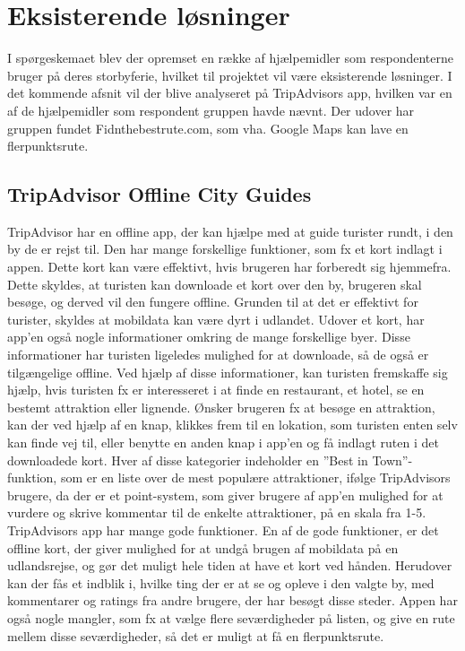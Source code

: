 \section{Eksisterende løsninger}
I spørgeskemaet blev der opremset en række af hjælpemidler som respondenterne bruger på deres storbyferie, hvilket til projektet vil være eksisterende løsninger. I det kommende afsnit vil der blive analyseret på TripAdvisors app, hvilken var en af de hjælpemidler som respondent gruppen havde nævnt. Der udover har gruppen fundet Fidnthebestrute.com, som vha. Google Maps kan lave en flerpunktsrute.  

\subsection{TripAdvisor Offline City Guides}
TripAdvisor har en offline app, der kan hjælpe med at guide turister rundt, i den by de er rejst til. Den har mange forskellige funktioner, som fx et kort indlagt i appen. Dette kort kan være effektivt, hvis brugeren har forberedt sig hjemmefra. Dette skyldes, at turisten kan downloade et kort over den by, brugeren skal besøge, og derved vil den fungere offline. Grunden til at det er effektivt for turister, skyldes at mobildata kan være dyrt i udlandet\citep {TDC}. \newline
Udover et kort, har app'en også nogle informationer omkring de mange forskellige byer. Disse informationer har turisten ligeledes mulighed for at downloade, så de også er tilgængelige offline. Ved hjælp af disse informationer, kan turisten fremskaffe sig hjælp, hvis turisten fx er interesseret i at finde en restaurant, et hotel, se en bestemt attraktion eller lignende. Ønsker brugeren fx at besøge en attraktion, kan der ved hjælp af en knap, klikkes frem til en lokation, som turisten enten selv kan finde vej til, eller benytte en anden knap i app'en og få indlagt ruten i det downloadede kort.\newline
Hver af disse kategorier indeholder en ”Best in Town”-funktion, som er en liste over de mest populære attraktioner, ifølge TripAdvisors brugere, da der er et point-system, som giver brugere af app'en mulighed for at vurdere og skrive kommentar til de enkelte attraktioner, på en skala fra 1-5. \newline
TripAdvisors app har mange gode funktioner. En af de gode funktioner, er det offline kort, der giver mulighed for at undgå brugen af mobildata på en udlandsrejse, og gør det muligt hele tiden at have et kort ved hånden. Herudover kan der fås et indblik i, hvilke ting der er at se og opleve i den valgte by, med kommentarer og ratings fra andre brugere, der har besøgt disse steder.
Appen har også nogle mangler, som fx at vælge flere seværdigheder på listen, og give en rute mellem disse seværdigheder, så det er muligt at få en flerpunktsrute. \newline
